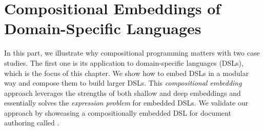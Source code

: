 \chapter{Compositional Embeddings of Domain-Specific Languages} \label{ch:embedding}

In this part, we illustrate why compositional programming matters with two case
studies. The first one is its application to domain-specific languages (DSLs),
which is the focus of this chapter. We show how to embed DSLs in a modular way
and compose them to build larger DSLs. This \emph{compositional embedding}
approach leverages the strengths of both shallow and deep embeddings and
essentially solves the \emph{expression problem} for embedded DSLs. We validate
our approach by showcasing a compositionally embedded DSL for document authoring
called \ExT.






